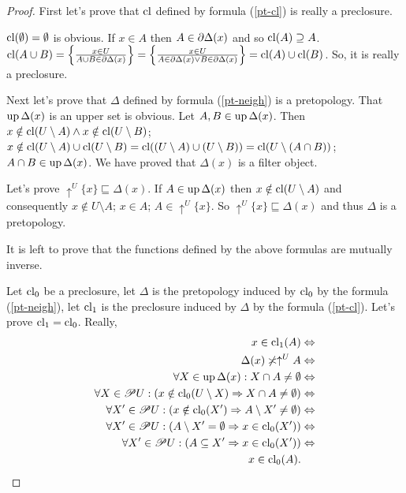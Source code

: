 \begin{proof}
First let's prove that $\operatorname{cl}$ defined by formula (\ref{pt-cl}) is
really a preclosure.

$\operatorname{cl}(\emptyset)=\emptyset$ is obvious. If $x\in A$ then $A\in\partial\Delta(x)$
and so $\operatorname{cl}(A)\supseteq A$. $\operatorname{cl}(A\cup B)=\left\{ \frac{x\in U}{A\cup B\in\partial\Delta(x)}\right\}=\left\{ \frac{x\in U}{A\in\partial\Delta(x)\lor B\in\partial\Delta(x)}\right\}=\operatorname{cl}(A)\cup\operatorname{cl}(B)$.
So, it is really a preclosure.

Next let's prove that $\Delta$ defined by formula (\ref{pt-neigh})
is a pretopology. That $\operatorname{up}\Delta(x)$ is an upper set is obvious.
Let $A,B\in\operatorname{up}\Delta(x)$. Then $x\notin\operatorname{cl}(U\setminus A)\land x\notin\operatorname{cl}(U\setminus B)$;
$x\notin\operatorname{cl}(U\setminus A)\cup\operatorname{cl}(U\setminus B)=\operatorname{cl}((U\setminus A)\cup(U\setminus B))=\operatorname{cl}(U\setminus(A\cap B))$;
$A\cap B\in\operatorname{up}\Delta(x)$. We have proved that $\Delta(x)$ is a filter
object.

Let's prove $\uparrow^{U}\{x\}\sqsubseteq\Delta(x)$. If $A\in\operatorname{up}\Delta(x)$
then $x\notin\operatorname{cl}(U\setminus A)$ and consequently $x\notin U\setminus A$;
$x\in A$; $A\in\uparrow^{U}\{x\}$. So $\uparrow^{U}\{x\}\sqsubseteq\Delta(x)$
and thus $\Delta$ is a pretopology.

It is left to prove that the functions defined by the above formulas
are mutually inverse.

Let $\operatorname{cl}_{0}$ be a preclosure, let $\Delta$ is the pretopology induced
by $\operatorname{cl}_{0}$ by the formula (\ref{pt-neigh}), let $\operatorname{cl}_{1}$ is
the preclosure induced by $\Delta$ by the formula (\ref{pt-cl}).
Let's prove $\operatorname{cl}_{1}=\operatorname{cl}_{0}$. Really,
\begin{align*}
x\in\operatorname{cl}_{1}(A) & \Leftrightarrow\\
\Delta(x)\not\asymp\uparrow^{U}A & \Leftrightarrow\\
\forall X\in\operatorname{up}\Delta(x):X\cap A\ne\emptyset & \Leftrightarrow\\
\forall X\in\mathscr{P} U:(x\notin\operatorname{cl}_{0}(U\setminus X)\Rightarrow X\cap A\ne\emptyset) & \Leftrightarrow\\
\forall X'\in\mathscr{P} U:(x\notin\operatorname{cl}_{0}(X')\Rightarrow A\setminus X'\ne\emptyset) & \Leftrightarrow\\
\forall X'\in\mathscr{P} U:(A\setminus X'=\emptyset\Rightarrow x\in\operatorname{cl}_{0}(X')) & \Leftrightarrow\\
\forall X'\in\mathscr{P} U:(A\subseteq X'\Rightarrow x\in\operatorname{cl}_{0}(X')) & \Leftrightarrow\\
x\in\operatorname{cl}_{0}(A).
\end{align*}



\end{proof}

